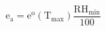 \documentclass[12pt]{article}
\begin{document}
\begin{displaymath}
\mathrm{e}_{\mathrm{a}}=\mathrm{e}^{\mathrm{o}}\left(\mathrm{T}_{\max }\right) \frac{\mathrm{RH}_{\min }}{100}
\end{displaymath}
\end{document}
